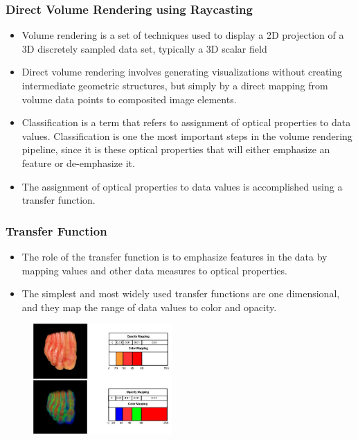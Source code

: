 \documentclass{beamer}
\begin{document}
\begin{frame}
\frametitle{Direct Volume Rendering using Raycasting}
\begin{itemize}
\item Volume rendering is a set of techniques used to display a 2D projection of a 3D discretely sampled data set, typically a 3D scalar field
\item Direct volume rendering involves generating visualizations without creating intermediate geometric structures, but simply by a direct mapping from volume data points to composited image elements.
\item Classification is a term that refers to assignment of optical properties to data values. Classification is one the most important steps in the volume rendering pipeline, since it is these optical properties that will either emphasize an feature or de-emphasize it.
\item The assignment of optical properties to data values is accomplished using a transfer function.
\end{itemize}
\end{frame}



\begin{frame}
\frametitle{Transfer Function}
\begin{itemize}
\item The role of the transfer function is to emphasize features in the data by mapping values and other data measures to optical properties. 
\item The simplest and most widely used transfer functions are one dimensional, and they map the range of data values to color and opacity.
\end{itemize}
\begin{figure}
\centering
\includegraphics[width=150pt,heigth=280pt]{foot_different_TF.jpg}
\end{figure}
\end{frame}

\end{document}
